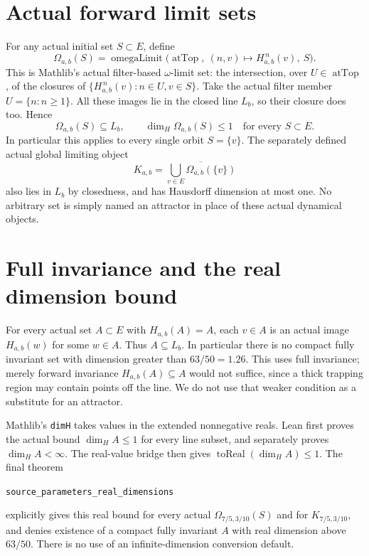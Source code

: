 \documentclass[11pt]{article}
\begin{document}
\newpage
\section{Actual forward limit sets}
For any actual initial set $S\subset E$, define
\[
 \Omega_{a,b}(S)=\operatorname{omegaLimit}
 \bigl(\operatorname{atTop},\ (n,v)\mapsto H_{a,b}^{\,n}(v),\ S\bigr).
\]
This is Mathlib's actual filter-based $\omega$-limit set: the
intersection, over $U\in\operatorname{atTop}$, of the closures of
$\{H_{a,b}^{\,n}(v):n\in U,v\in S\}$.
Take the actual filter member $U=\{n:n\ge1\}$. All these images
lie in the closed line $L_b$, so their closure does too. Hence
\[
 \Omega_{a,b}(S)\subseteq L_b,\qquad
 \dim_H\Omega_{a,b}(S)\le1\quad\text{for every }S\subset E.
\]
In particular this applies to every single orbit $S=\{v\}$.
The separately defined actual global limiting object
\[
 K_{a,b}=\overline{\bigcup_{v\in E}\Omega_{a,b}(\{v\})}
\]
also lies in $L_b$ by closedness, and has Hausdorff dimension at
most one. No arbitrary set is simply named an attractor in place
of these actual dynamical objects.

\section{Full invariance and the real dimension bound}
For every actual set $A\subset E$ with $H_{a,b}(A)=A$, each
$v\in A$ is an actual image $H_{a,b}(w)$ for some $w\in A$.
Thus $A\subseteq L_b$. In particular there is no compact fully
invariant set with dimension greater than $63/50=1.26$.
This uses full invariance; merely forward invariance
$H_{a,b}(A)\subseteq A$ would not suffice, since a thick trapping
region may contain points off the line. We do not use that weaker
condition as a substitute for an attractor.

Mathlib's \texttt{dimH} takes values in the extended nonnegative
reals. Lean first proves the actual bound $\dim_H A\le1$ for every
line subset, and separately proves $\dim_H A<\infty$.
The real-value bridge then gives
$\operatorname{toReal}(\dim_H A)\le1$. The final theorem
\begin{center}\small\texttt{source\_parameters\_real\_dimensions}\end{center}
explicitly gives this real bound for every actual $\Omega_{7/5,3/10}(S)$ and for
$K_{7/5,3/10}$, and denies existence of a compact fully invariant
$A$ with real dimension above $63/50$. There is no use of an
infinite-dimension conversion default.
\end{document}
